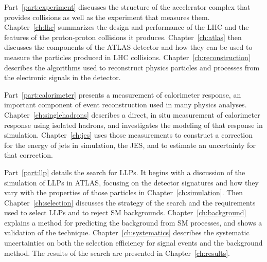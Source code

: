 Part~\ref{part:experiment} discusses the structure of the accelerator complex that provides collisions as well as the experiment that measures them.
Chapter~\ref{ch:lhc} summarizes the design and performance of the \ac{LHC} and the features of the proton-proton collisions it produces.
Chapter~\ref{ch:atlas} then discusses the components of the ATLAS detector and how they can be used to measure the particles produced in \ac{LHC} collisions.
Chapter~\ref{ch:reconstruction} describes the algorithms used to reconstruct physics particles and processes from the electronic signals in the detector.

Part~\ref{part:calorimeter} presents a measurement of calorimeter response, an important component of event reconstruction used in many physics analyses.
Chapter~\ref{ch:singlehadrons} describes a direct, in situ measurement of calorimeter response using isolated hadrons, and investigates the modeling of that response in simulation.
Chapter~\ref{ch:jes} uses those measurements to construct a correction for the energy of jets in simulation, the \ac{JES}, and to estimate an uncertainty for that correction.

Part~\ref{part:llp} details the search for \acp{LLP}.
It begins with a discussion of the simulation of \acp{LLP} in ATLAS, focusing on the detector signatures and how they vary with the properties of those particles in Chapter~\ref{ch:simulation}.
Then Chapter~\ref{ch:selection} discusses the strategy of the search and the requirements used to select \acp{LLP} and to reject \ac{SM} backgrounds.
Chapter~\ref{ch:background} explains a method for predicting the background from \ac{SM} processes, and shows a validation of the technique.
Chapter~\ref{ch:systematics} describes the systematic uncertainties on both the selection efficiency for signal events and the background method.
The results of the search are presented in Chapter~\ref{ch:results}. 


